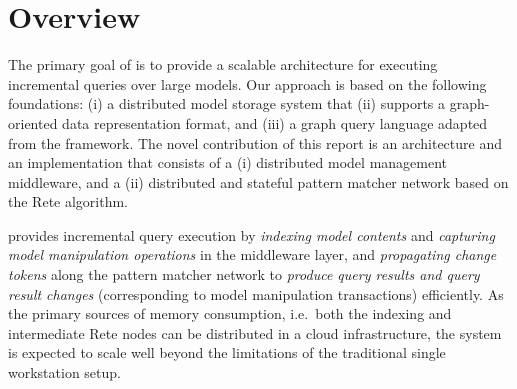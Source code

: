 \chapter{Overview}
\label{chap:overview}

The primary goal of \iqd{} is to provide a scalable architecture for executing incremental queries over large models. Our approach is based on the following foundations: (i) a distributed model storage system that (ii) supports a graph-oriented data representation format, and (iii) a graph query language adapted from the \eiq{} framework. The novel contribution of this report is an architecture and an implementation that consists of a (i) distributed model management middleware, and a (ii) distributed and stateful pattern matcher network based on the Rete algorithm.

\iqd{} provides incremental query execution by \emph{indexing model contents} and \emph{capturing model manipulation operations} in the middleware layer, and \emph{propagating change tokens} along the pattern matcher network to \emph{produce query results and query result changes} (corresponding to model manipulation transactions) efficiently. As the primary sources of memory consumption, i.e.\ both the indexing and intermediate Rete nodes can be distributed in a cloud infrastructure, the system is expected to scale well beyond the limitations of the traditional single workstation setup.













